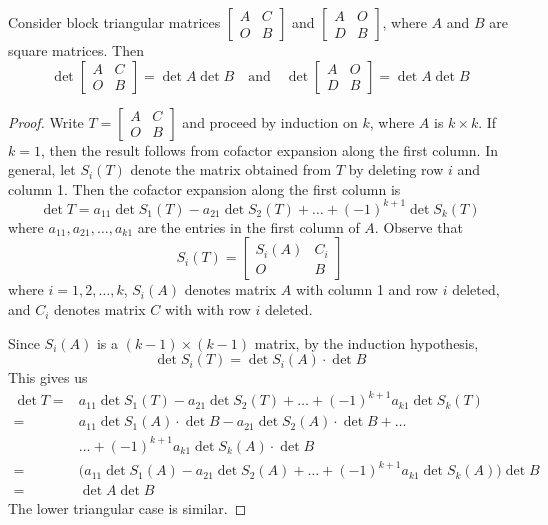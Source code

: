 \documentclass{ximera}
\begin{document}
 \begin{theorem}\label{th:blockTriDet}
     Consider block triangular matrices $\begin{bmatrix}A & C\\O& B\end{bmatrix}$ and $\begin{bmatrix}A & O\\D& B\end{bmatrix}$, where $A$ and $B$ are square matrices.  Then
     $$\det{\begin{bmatrix}A & C\\O& B\end{bmatrix}}=\det{A}\det{B}\quad\mbox{and}\quad\det{\begin{bmatrix}A & O\\D& B\end{bmatrix}}=\det{A}\det{B}$$
 \end{theorem}
\begin{proof}
    Write $T=\begin{bmatrix}A & C\\O& B\end{bmatrix}$ and proceed by induction on $k$, where $A$ is $k\times k$.  If $k=1$, then the result follows from cofactor expansion along the first column.  In general, let $S_i(T)$ denote the matrix obtained from $T$ by deleting row $i$ and column 1. Then the cofactor expansion along the first column is
    $$\det{T}=a_{11}\det{S_1(T)}-a_{21}\det{S_2(T)}+\dots + (-1)^{k+1}\det{S_k(T)}$$
    where $a_{11}, a_{21},\dots , a_{k1}$ are the entries in the first column of $A$.  Observe that 
    $$S_i(T)=\begin{bmatrix}S_i(A) & C_i\\O& B\end{bmatrix}$$
    where $i=1,2,\dots , k$, $S_i(A)$ denotes matrix $A$ with column 1 and row $i$ deleted, and $C_i$ denotes matrix $C$ with with row $i$ deleted.
    
    Since $S_i(A)$ is a $(k-1)\times (k-1)$ matrix, by the induction hypothesis,
    $$\det{S_i(T)}=\det{S_i(A)}\cdot \det{B}$$
    This gives us
    \begin{align*}
        \det{T}=&a_{11}\det{S_1(T)}-a_{21}\det{S_2(T)}+\dots + (-1)^{k+1}a_{k1}\det{S_k(T)}\\
        =&a_{11}\det{S_1(A)}\cdot\det{B}-a_{21}\det{S_2(A)}\cdot\det{B}+\dots \\
        &\dots+ (-1)^{k+1}a_{k1}\det{S_k(A)}\cdot\det{B}\\
        =&\Big(a_{11}\det{S_1(A)}-a_{21}\det{S_2(A)}+\dots + (-1)^{k+1}a_{k1}\det{S_k(A)}\Big)\det{B}\\
        =&\det{A}\det{B}
    \end{align*}
    The lower triangular case is similar.
\end{proof}
\end{document}
